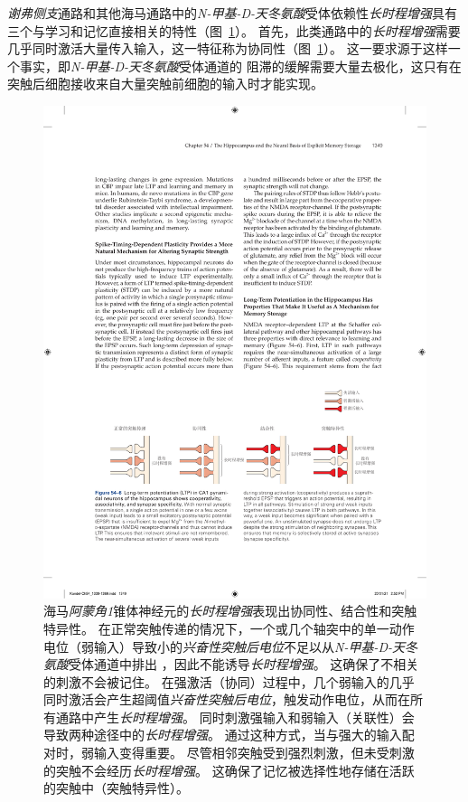 \textit{谢弗侧支}通路和其他海马通路中的\textit{N-甲基-D-天冬氨酸}受体依赖性\textit{长时程增强}具有三个与学习和记忆直接相关的特性（图~\ref{fig:54_6}）。
首先，此类通路中的\textit{长时程增强}需要几乎同时激活大量传入输入，这一特征称为协同性（图~\ref{fig:54_6}）。
这一要求源于这样一个事实，即\textit{N-甲基-D-天冬氨酸}受体通道的  阻滞的缓解需要大量去极化，这只有在突触后细胞接收来自大量突触前细胞的输入时才能实现。


\begin{figure}[htbp]
	\centering
	\includegraphics[width=1.0\linewidth]{chap54/fig_54_6}
	\caption{海马\textit{阿蒙角1}锥体神经元的\textit{长时程增强}表现出协同性、结合性和突触特异性。
		在正常突触传递的情况下，一个或几个轴突中的单一动作电位（弱输入）导致小的\textit{兴奋性突触后电位}不足以从\textit{N-甲基-D-天冬氨酸}受体通道中排出 ，因此不能诱导\textit{长时程增强}。
		这确保了不相关的刺激不会被记住。 在强激活（协同）过程中，几个弱输入的几乎同时激活会产生超阈值\textit{兴奋性突触后电位}，触发动作电位，从而在所有通路中产生\textit{长时程增强}。
		同时刺激强输入和弱输入（关联性）会导致两种途径中的\textit{长时程增强}。
		通过这种方式，当与强大的输入配对时，弱输入变得重要。
		尽管相邻突触受到强烈刺激，但未受刺激的突触不会经历\textit{长时程增强}。
		这确保了记忆被选择性地存储在活跃的突触中（突触特异性）。}
	\label{fig:54_6}
\end{figure}


